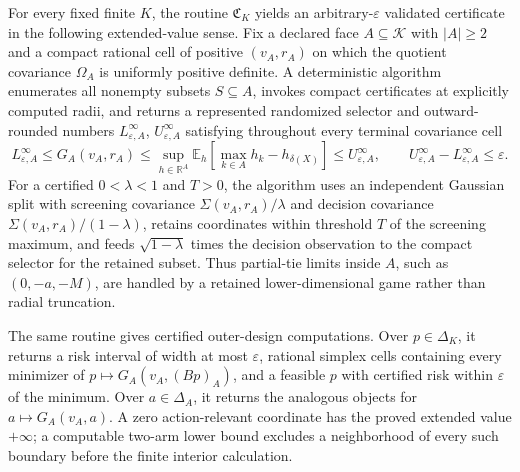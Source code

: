For every fixed finite \(K\), the routine \(\mathfrak C_K\) yields an arbitrary-\(\varepsilon\) validated certificate in the following extended-value sense.  Fix a declared face \(A\subseteq\mathcal K\) with \(|A|\geq2\) and a compact rational cell of positive \((v_A,r_A)\) on which the quotient covariance \(\Omega_A\) is uniformly positive definite.  A deterministic algorithm enumerates all nonempty subsets \(S\subseteq A\), invokes compact certificates at explicitly computed radii, and returns a represented randomized selector and outward-rounded numbers \(L^{\infty}_{\varepsilon,A}\), \(U^{\infty}_{\varepsilon,A}\) satisfying throughout every terminal covariance cell
\[
L^{\infty}_{\varepsilon,A}
\leq G_A(v_A,r_A)
\leq \sup_{h\in\mathbb R^A}
\mathbb E_h\!\left[\max_{k\in A}h_k-h_{\delta(X)}\right]
\leq U^{\infty}_{\varepsilon,A},
\qquad
U^{\infty}_{\varepsilon,A}-L^{\infty}_{\varepsilon,A}\leq\varepsilon.
\]
For a certified \(0<\lambda<1\) and \(T>0\), the algorithm uses an independent Gaussian split with screening covariance \(\Sigma(v_A,r_A)/\lambda\) and decision covariance \(\Sigma(v_A,r_A)/(1-\lambda)\), retains coordinates within threshold \(T\) of the screening maximum, and feeds \(\sqrt{1-\lambda}\) times the decision observation to the compact selector for the retained subset.  Thus partial-tie limits inside \(A\), such as \((0,-a,-M)\), are handled by a retained lower-dimensional game rather than radial truncation.

The same routine gives certified outer-design computations.  Over \(p\in\Delta_K\), it returns a risk interval of width at most \(\varepsilon\), rational simplex cells containing every minimizer of \(p\mapsto G_A(v_A,(Bp)_A)\), and a feasible \(p\) with certified risk within \(\varepsilon\) of the minimum.  Over \(a\in\Delta_A\), it returns the analogous objects for \(a\mapsto G_A(v_A,a)\).  A zero action-relevant coordinate has the proved extended value \(+\infty\); a computable two-arm lower bound excludes a neighborhood of every such boundary before the finite interior calculation.


